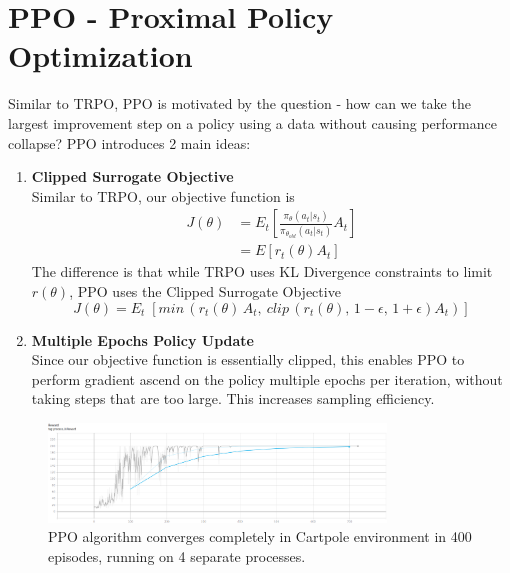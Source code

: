 \documentclass[11pt]{article} %
\begin{document}
\section{PPO - Proximal Policy Optimization}
Similar to TRPO, PPO is motivated by the question - how can we take the largest improvement step on a policy using a data without causing performance collapse? PPO introduces 2 main ideas:
\begin{enumerate}
    \item \textbf{Clipped Surrogate Objective}\\
    Similar to TRPO, our objective function is 
    \begin{equation*}
    \begin{split}
        J(\theta) &= E_t[\frac{\pi_\theta(a_t|s_t)}{\pi_{\theta_{old}}(a_t|s_t)}A_t] \\
        &= E[r_t(\theta)A_t]
    \end{split}
    \end{equation*}
    The difference is that while TRPO uses KL Divergence constraints to limit $r(\theta)$, PPO uses the Clipped Surrogate Objective
    \begin{equation*}
        J(\theta) = E_t\;[min\,(r_t(\theta)\,A_t, \: clip\,(r_t(\theta),\, 1-\epsilon,\, 1+\epsilon)A_t)]
    \end{equation*}
    \item \textbf{Multiple Epochs Policy Update}\\
    Since our objective function is essentially clipped, this enables PPO to perform gradient ascend on the policy multiple epochs per iteration, without taking steps that are too large. This increases sampling efficiency.
\end{enumerate}
\begin{figure}
    \centering
    \includegraphics[width=0.8\textwidth]{images/ppo_cartpole.png}
    \caption{PPO algorithm converges completely in Cartpole environment in 400 episodes, running on 4 separate processes.}
    \label{fig:my_label}
\end{figure}
\end{document}
